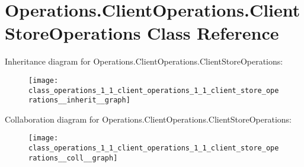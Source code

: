 \hypertarget{class_operations_1_1_client_operations_1_1_client_store_operations}{}\section{Operations.\+Client\+Operations.\+Client\+Store\+Operations Class Reference}
\label{class_operations_1_1_client_operations_1_1_client_store_operations}


Inheritance diagram for Operations.\+Client\+Operations.\+Client\+Store\+Operations\+:
\nopagebreak
\begin{figure}[H]
\begin{center}
\leavevmode
\texttt{[image: class\_operations\_1\_1\_client\_operations\_1\_1\_client\_store\_operations\_\_inherit\_\_graph]}
\end{center}
\end{figure}


Collaboration diagram for Operations.\+Client\+Operations.\+Client\+Store\+Operations\+:
\nopagebreak
\begin{figure}[H]
\begin{center}
\leavevmode
\texttt{[image: class\_operations\_1\_1\_client\_operations\_1\_1\_client\_store\_operations\_\_coll\_\_graph]}
\end{center}
\end{figure}
